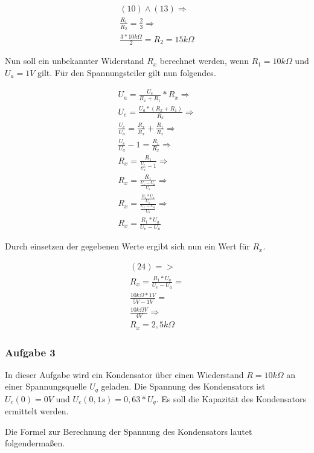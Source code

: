 \begin{align}
    (10) \land (13) \Rightarrow \\
    \frac{R_1}{R_2} = \frac{2}{3} \Rightarrow \\
    \frac{3 * 10k\Omega}{2} = R_2 = 15k\Omega
\end{align}

Nun soll ein unbekannter Widerstand $R_x$ berechnet werden, wenn $R_1 = 10k\Omega$ und $U_a = 1V$ gilt.
Für den Spannungsteiler gilt nun folgendes.

\begin{align}
    U_a = \frac{U_e}{R_x + R_1} * R_x \Rightarrow \\
    U_e = \frac{U_a * (R_x + R_1)}{R_x} \Rightarrow \\
    \frac{U_e}{U_a} = \frac{R_x}{R_x} + \frac{R_1}{R_x} \Rightarrow \\
    \frac{U_e}{U_a} - 1 = \frac{R_1}{R_x} \Rightarrow \\
    R_x = \frac{R_1}{\frac{U_e}{U_a} - 1} \Rightarrow \\
    R_x = \frac{R_1}{\frac{U_e - U_a}{U_a}} \Rightarrow\\
    R_x = \frac{\frac{R_1 * U_a}{U_a}}{\frac{U_e - U_a}{U_a}} \Rightarrow \\
    R_x = \frac{R_1 * U_a}{U_e - U_a}
\end{align}

Durch einsetzen der gegebenen Werte ergibt sich nun ein Wert für $R_x$.

\begin{align}
    (24) => \\
    R_x = \frac{R_1 * U_a}{U_e - U_a} = \\
    \frac{10k\Omega * 1V}{5V - 1V} = \\
    \frac{10k\Omega V}{4V} \Rightarrow \\
    R_x = 2,5k\Omega
\end{align}

\subsubsection{Aufgabe 3}

In dieser Aufgabe wird ein Kondensator über einen Wiederstand $R = 10k\Omega$ an einer Spannungsquelle $U_q$ geladen.
Die Spannung des Kondensators ist $U_c(0) = 0V$ und $U_c(0,1s) = 0,63 * U_q$.
Es soll die Kapazität des Kondensators ermittelt werden.

Die Formel zur Berechnung der Spannung des Kondensators lautet folgendermaßen.

